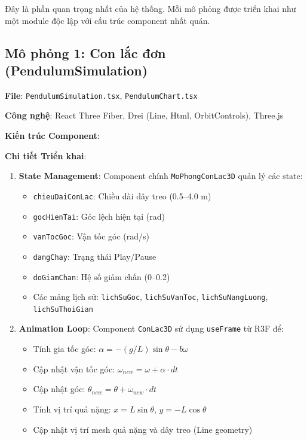 Đây là phần quan trọng nhất của hệ thống. Mỗi mô phỏng được triển khai như một module độc lập với cấu trúc component nhất quán.

\subsection{Mô phỏng 1: Con lắc đơn (PendulumSimulation)}

\textbf{File}: \texttt{PendulumSimulation.tsx}, \texttt{PendulumChart.tsx}

\textbf{Công nghệ}: React Three Fiber, Drei (Line, Html, OrbitControls), Three.js

\textbf{Kiến trúc Component}:



\textbf{Chi tiết Triển khai}:

\begin{enumerate}
    \item \textbf{State Management}: Component chính \texttt{MoPhongConLac3D} quản lý các state:
    \begin{itemize}
        \item \texttt{chieuDaiConLac}: Chiều dài dây treo (0.5–4.0 m)
        \item \texttt{gocHienTai}: Góc lệch hiện tại (rad)
        \item \texttt{vanTocGoc}: Vận tốc góc (rad/s)
        \item \texttt{dangChay}: Trạng thái Play/Pause
        \item \texttt{doGiamChan}: Hệ số giảm chấn (0–0.2)
        \item Các mảng lịch sử: \texttt{lichSuGoc}, \texttt{lichSuVanToc}, \texttt{lichSuNangLuong}, \texttt{lichSuThoiGian}
    \end{itemize}
    
    \item \textbf{Animation Loop}: Component \texttt{ConLac3D} sử dụng \texttt{useFrame} từ R3F để:
    \begin{itemize}
        \item Tính gia tốc góc: $\alpha = -(g/L)\sin\theta - b\omega$
        \item Cập nhật vận tốc góc: $\omega_{new} = \omega + \alpha \cdot dt$
        \item Cập nhật góc: $\theta_{new} = \theta + \omega_{new} \cdot dt$
        \item Tính vị trí quả nặng: $x = L\sin\theta$, $y = -L\cos\theta$
        \item Cập nhật vị trí mesh quả nặng và dây treo (Line geometry)
    \end{itemize}
    

\end{enumerate}
